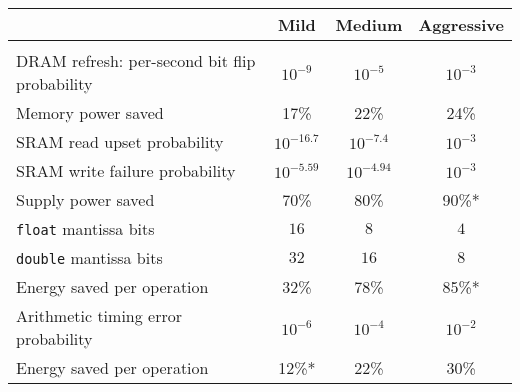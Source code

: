 \centering
\begin{tabular}{ p{2.7in} c c c}
 & Mild & Medium & Aggressive \\
\midrule \\[-2ex]
DRAM refresh: per-second bit flip probability
& $10^{-9}$ & $10^{-5}$ & $10^{-3}$ \\
Memory power saved
& 17\% & 22\% & 24\% \\[2ex]

SRAM read upset probability
& $10^{-16.7}$ & $10^{-7.4}$ & $10^{-3}$ \\
SRAM write failure probability
& $10^{-5.59}$ & $10^{-4.94}$ & $10^{-3}$ \\
Supply power saved
& 70\% & 80\% & 90\%* \\[2ex]

\texttt{float} mantissa bits
& $16$ & $8$ & $4$ \\
\texttt{double} mantissa bits
& $32$ & $16$ & $8$ \\
Energy saved per operation
& 32\% & 78\% & 85\%* \\[2ex]

Arithmetic timing error probability
& $10^{-6}$ & $10^{-4}$ & $10^{-2}$ \\
Energy saved per operation
& 12\%* & 22\% & 30\% \\
\end{tabular}
